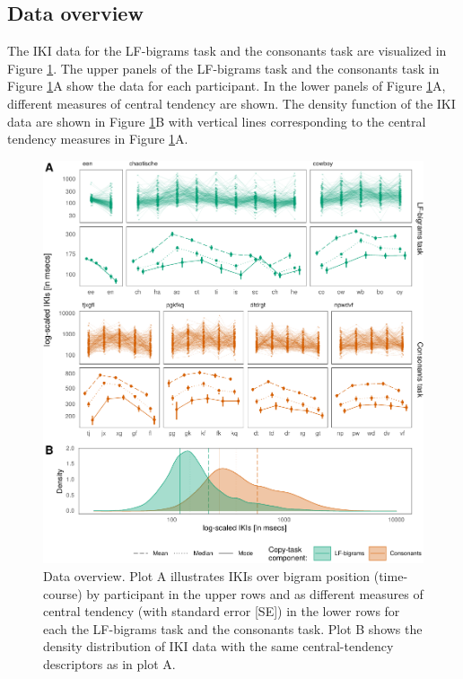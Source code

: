 \documentclass[
  english,
  man,mask,floatsintext]{apa7}
\begin{document}
\hypertarget{data-overview}{%
\subsection{Data overview}\label{data-overview}}

The IKI data for the LF-bigrams task and the consonants task are visualized in Figure \ref{fig:descriptives}. The upper panels of the LF-bigrams task and the consonants task in Figure \ref{fig:descriptives}A show the data for each participant. In the lower panels of Figure \ref{fig:descriptives}A, different measures of central tendency are shown. The density function of the IKI data are shown in Figure \ref{fig:descriptives}B with vertical lines corresponding to the central tendency measures in Figure \ref{fig:descriptives}A.

\begin{landscape}
\begin{figure}[bp!]

{\centering \includegraphics{report_files/figure-latex/descriptives-1} 

}

\caption{Data overview. Plot A illustrates IKIs over bigram position (time-course) by participant in the upper rows and as different measures of central tendency (with standard error [SE]) in the lower rows for each the LF-bigrams task and the consonants task. Plot B shows the density distribution of IKI data with the same central-tendency descriptors as in plot A.}\label{fig:descriptives}
\end{figure}
\end{landscape}
\end{document}
